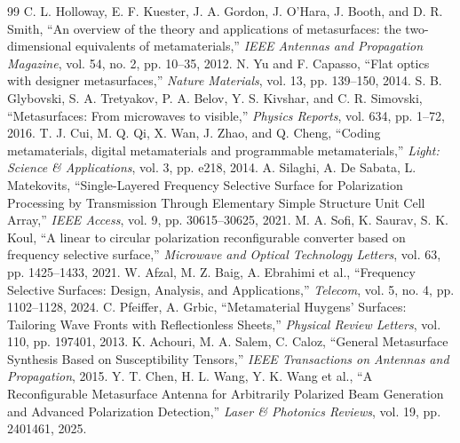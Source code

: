 \begin{thebibliography}{99}
 C. L. Holloway, E. F. Kuester, J. A. Gordon, J. O'Hara, J. Booth, and D. R. Smith, ``An overview of the theory and applications of metasurfaces: the two-dimensional equivalents of metamaterials,'' \emph{IEEE Antennas and Propagation Magazine}, vol. 54, no. 2, pp. 10--35, 2012.
 N. Yu and F. Capasso, ``Flat optics with designer metasurfaces,'' \emph{Nature Materials}, vol. 13, pp. 139--150, 2014.
 S. B. Glybovski, S. A. Tretyakov, P. A. Belov, Y. S. Kivshar, and C. R. Simovski, ``Metasurfaces: From microwaves to visible,'' \emph{Physics Reports}, vol. 634, pp. 1--72, 2016.
 T. J. Cui, M. Q. Qi, X. Wan, J. Zhao, and Q. Cheng, ``Coding metamaterials, digital metamaterials and programmable metamaterials,'' \emph{Light: Science \& Applications}, vol. 3, pp. e218, 2014.
 A. Silaghi, A. De Sabata, L. Matekovits, ``Single-Layered Frequency Selective Surface for Polarization Processing by Transmission Through Elementary Simple Structure Unit Cell Array,'' \emph{IEEE Access}, vol. 9, pp. 30615--30625, 2021.
 M. A. Sofi, K. Saurav, S. K. Koul, ``A linear to circular polarization reconfigurable converter based on frequency selective surface,'' \emph{Microwave and Optical Technology Letters}, vol. 63, pp. 1425--1433, 2021.
 W. Afzal, M. Z. Baig, A. Ebrahimi et al., ``Frequency Selective Surfaces: Design, Analysis, and Applications,'' \emph{Telecom}, vol. 5, no. 4, pp. 1102--1128, 2024.
 C. Pfeiffer, A. Grbic, ``Metamaterial Huygens' Surfaces: Tailoring Wave Fronts with Reflectionless Sheets,'' \emph{Physical Review Letters}, vol. 110, pp. 197401, 2013.
 K. Achouri, M. A. Salem, C. Caloz, ``General Metasurface Synthesis Based on Susceptibility Tensors,'' \emph{IEEE Transactions on Antennas and Propagation}, 2015.
 Y. T. Chen, H. L. Wang, Y. K. Wang et al., ``A Reconfigurable Metasurface Antenna for Arbitrarily Polarized Beam Generation and Advanced Polarization Detection,'' \emph{Laser \& Photonics Reviews}, vol. 19, pp. 2401461, 2025.
\end{thebibliography}
